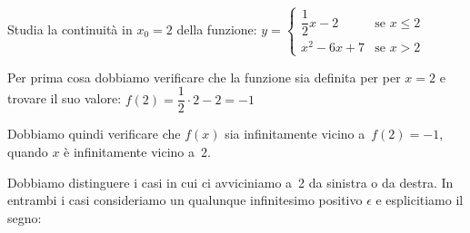 \begin{esempio}
Studia la continuità in \(x_0=2\) della funzione: 
\(y=\begin{cases} 
    \dfrac{1}{2}x-2 & \text{se } x \leqslant 2 \\ 
    x^2-6x+7 & \text{se } x > 2
  \end{cases}\)

Per prima cosa dobbiamo verificare che la funzione sia definita per 
per \(x=2\) e trovare il suo valore: 
\(f(2) = \dfrac{1}{2} \cdot 2-2 = -1\)

Dobbiamo quindi verificare che \(f(x)\) sia infinitamente vicino 
a~\(f(2) = -1\), quando \(x\) è infinitamente vicino a~\(2\).

Dobbiamo distinguere i casi in cui ci avviciniamo a~2 da sinistra o da 
destra. In entrambi i casi consideriamo un qualunque infinitesimo positivo 
\(\epsilon\) e esplicitiamo il segno:

\end{esempio}

% 

